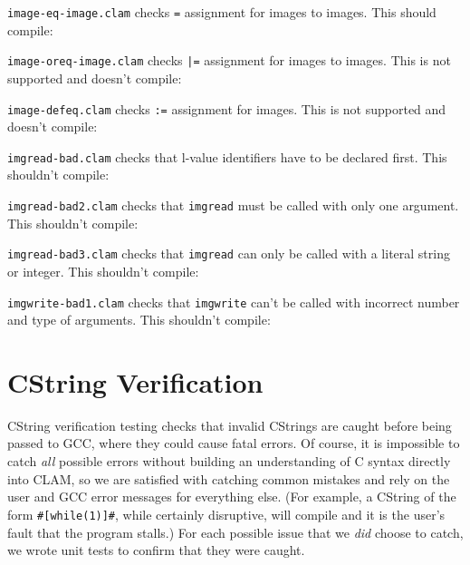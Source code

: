 \texttt{image-eq-image.clam} checks \texttt{=} assignment for images to images. This should compile:


\texttt{image-oreq-image.clam} checks \texttt{|=} assignment for images to images. This is not supported and doesn't compile:


\texttt{image-defeq.clam} checks \texttt{:=} assignment for images. This is not supported and doesn't compile:


\texttt{imgread-bad.clam} checks that l-value identifiers have to be declared first. This shouldn't compile:


\texttt{imgread-bad2.clam} checks that \texttt{imgread} must be called with only one argument. This shouldn't compile:


\texttt{imgread-bad3.clam} checks that \texttt{imgread} can only be called with a literal string or integer. This shouldn't compile:


\texttt{imgwrite-bad1.clam} checks that \texttt{imgwrite} can't be called with incorrect number and type of arguments. This shouldn't compile:




\section{CString Verification}
\label{testing:cstrings}

CString verification testing checks that invalid CStrings are caught before being passed to GCC, where they
could cause fatal errors. Of course, it is impossible to catch \emph{all} possible errors without
building an understanding of C syntax directly into CLAM, so we are satisfied with catching common
mistakes and rely on the user and GCC error messages for everything else. (For example, a CString of the form \texttt{\#[while(1)]\#},
while certainly disruptive, will compile and it is the user's fault that the program stalls.)
For each possible issue that we \emph{did} choose to catch, we wrote unit tests to confirm that they were caught.\\

